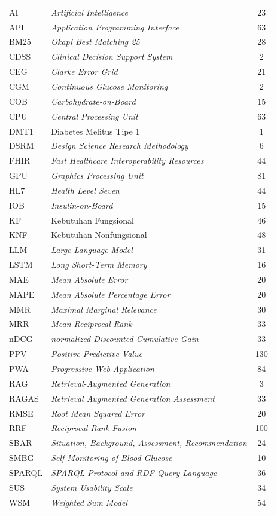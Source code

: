 \begin{longtable}{@{} l >{\raggedright\arraybackslash}p{7.5cm} c @{}}
AI & \textit{Artificial Intelligence} & 23 \\
API & \textit{Application Programming Interface} & 63 \\
BM25 & \textit{Okapi Best Matching 25} & 28 \\
CDSS & \textit{Clinical Decision Support System} & 2 \\
CEG & \textit{Clarke Error Grid} & 21 \\
CGM & \textit{Continuous Glucose Monitoring} & 2 \\
COB & \textit{Carbohydrate-on-Board} & 15 \\
CPU & \textit{Central Processing Unit} & 63 \\
DMT1 & Diabetes Melitus Tipe 1 & 1 \\
DSRM & \textit{Design Science Research Methodology} & 6 \\
FHIR & \textit{Fast Healthcare Interoperability Resources} & 44 \\
GPU & \textit{Graphics Processing Unit} & 81 \\
HL7 & \textit{Health Level Seven} & 44 \\
IOB & \textit{Insulin-on-Board} & 15 \\
KF & Kebutuhan Fungsional & 46 \\
KNF & Kebutuhan Nonfungsional & 48 \\
LLM & \textit{Large Language Model} & 31 \\
LSTM & \textit{Long Short-Term Memory} & 16 \\
MAE & \textit{Mean Absolute Error} & 20 \\
MAPE & \textit{Mean Absolute Percentage Error} & 20 \\
MMR & \textit{Maximal Marginal Relevance} & 30 \\
MRR & \textit{Mean Reciprocal Rank} & 33 \\
nDCG & \textit{normalized Discounted Cumulative Gain} & 33 \\
PPV & \textit{Positive Predictive Value} & 130 \\
PWA & \textit{Progressive Web Application} & 84 \\
RAG & \textit{Retrieval-Augmented Generation} & 3 \\
RAGAS & \textit{Retrieval Augmented Generation Assessment} & 33 \\
RMSE & \textit{Root Mean Squared Error} & 20 \\
RRF & \textit{Reciprocal Rank Fusion} & 100 \\
SBAR & \textit{Situation, Background, Assessment, Recommendation} & 24 \\
SMBG & \textit{Self-Monitoring of Blood Glucose} & 10 \\
SPARQL & \textit{SPARQL Protocol and RDF Query Language} & 36 \\
SUS & \textit{System Usability Scale} & 34 \\
WSM & \textit{Weighted Sum Model} & 54 \\

\end{longtable}
\endgroup
